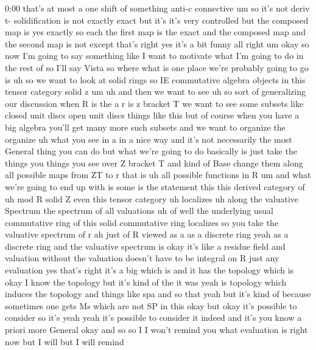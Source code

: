 \begin{unfinished}{0:00}
that's  at  most  a  one  shift  of  something
anti-c  connective  um  so  it's  not  deriv
t-  solidification  is  not  exactly  exact
but  it's  it's  very  controlled  but  the
composed  map  is  yes  exactly  so  each  the
first  map  is  the  exact  and  the  composed
map  and  the
second  map  is  not  except  that's  right
yes  it's  a  bit
funny  all
right  um  okay  so  now  I'm  going  to  say
something  like  I  want  to  motivate  what
I'm  going  to  do  in  the  rest
of  so  I'll  say
Vista  so  where  what  is  one  place  we're
probably  going  to  go  is  uh  so  we  want  to
look  at  solid
rings  so
IE  commutative  algebra  objects  in  this
tensor  category  solid  z
um
uh  and  then  we  want  to  see  uh  so  sort  of
generalizing  our  discussion  when  R  is
the  a  r  is  z  bracket  T  we  want  to  see
some  subsets  like  closed  unit  discs  open
unit  discs  things  like  this  but  of
course  when  you  have  a  big  algebra
you'll  get  many  more  such  subsets  and  we
want  to  organize  the  organize  uh  what
you  see  in  a  in  a  nice  way  and  it's  not
necessarily  the  most  General  thing  you
can  do  but  what  we're  going  to  do
basically  is  just  take  the  things  you
things  you  see  over  Z  bracket  T  and  kind
of  Base  change  them  along  all  possible
maps  from  ZT  to  r  that  is  uh  all
possible  functions  in  R  um  and  what
we're  going  to  end  up  with  is  some  is
the  statement  this  this  derived  category
of  uh  mod  R  solid
Z  even  this  tensor  category
uh
localizes  uh
along  the  valuative  Spectrum  the
spectrum  of  all
valuations  uh  of  well  the  underlying
usual  commutative  ring  of  this  solid
commutative
ring  localizes  so  you  take  the  valuative
spectrum  of  r  ah  just  of  R  viewed  as  a
as  a  discrete  ring  yeah  as  a  discrete
ring  and  the  valuative  spectrum
is  okay  it's  like  a  residue  field  and
valuation
without  the  valuation  doesn't  have  to  be
integral  on  R  just  any  evaluation  yes
that's  right  it's  a  big  which
is  and  it  has  the  topology  which  is  okay
I  know  the  topology  but  it's  kind  of  the
it
was  yeah  is  topology  which  induces  the
topology  and  things  like  spa  and  so  that
yeah  but  it's  kind  of  because  sometimes
one  gets  Ms  which  are  not  SP  in  this
okay  but  okay  it's  possible  to  consider
so  it's  yeah  yeah  it's  possible  to
consider  it  indeed  and  it's  you  know  a
priori  more  General  okay  and  so  so  I  I
won't  remind  you  what  evaluation  is
right  now  but  I  will  but  I  will  remind

\end{unfinished}
